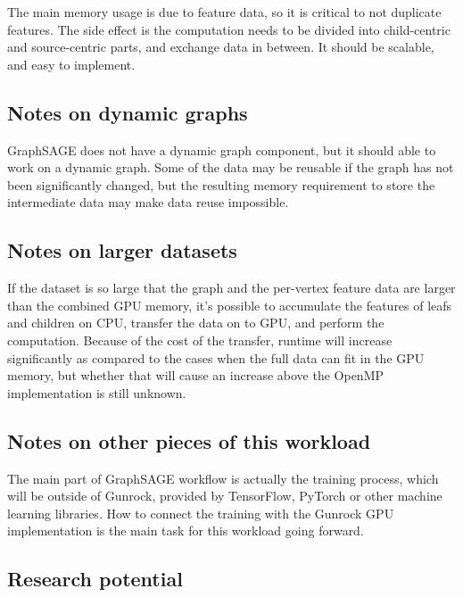 \documentclass[10pt,oneside]{memoir}
\begin{document}
The main memory usage is due to feature data, so it is critical to not
duplicate features. The side effect is the computation needs to be
divided into child-centric and source-centric parts, and exchange data
in between. It should be scalable, and easy to implement.

\hypertarget{notes-on-dynamic-graphs-2}{%
\subsection{Notes on dynamic graphs}\label{notes-on-dynamic-graphs-2}}

GraphSAGE does not have a dynamic graph component, but it should able to
work on a dynamic graph. Some of the data may be reusable if the graph
has not been significantly changed, but the resulting memory requirement
to store the intermediate data may make data reuse impossible.

\hypertarget{notes-on-larger-datasets-2}{%
\subsection{Notes on larger datasets}\label{notes-on-larger-datasets-2}}

If the dataset is so large that the graph and the per-vertex feature
data are larger than the combined GPU memory, it's possible to
accumulate the features of leafs and children on CPU, transfer the data
on to GPU, and perform the computation. Because of the cost of the
transfer, runtime will increase significantly as compared to the cases
when the full data can fit in the GPU memory, but whether that will
cause an increase above the OpenMP implementation is still unknown.

\hypertarget{notes-on-other-pieces-of-this-workload-2}{%
\subsection{Notes on other pieces of this
workload}\label{notes-on-other-pieces-of-this-workload-2}}

The main part of GraphSAGE workflow is actually the training process,
which will be outside of Gunrock, provided by TensorFlow, PyTorch or
other machine learning libraries. How to connect the training with the
Gunrock GPU implementation is the main task for this workload going
forward.

\hypertarget{research-potential-1}{%
\subsection{Research potential}\label{research-potential-1}}
\end{document}
